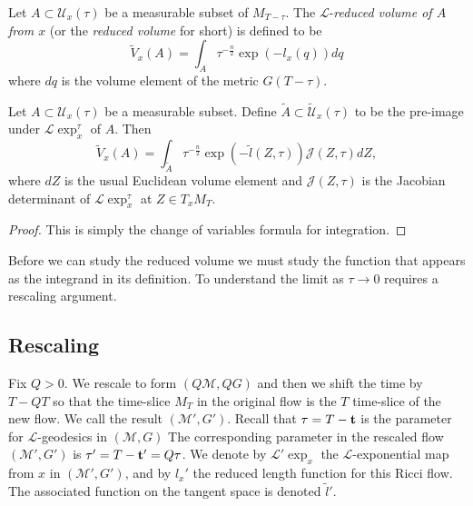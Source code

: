 \begin{definition}\label{def:reduced-volume}
\label{redvol}
Let $A\subset {\mathcal U}_x(\tau)$ be a  measurable subset of
$M_{T-\tau}$. The $\mathcal{L}$-{\em reduced volume of $A$ from $x$}
(or the {\em reduced volume} for short) is
defined to be
$$\widetilde V_x(A) = \int_{A} \tau^{-\frac{n}{2}}\exp(-l_x(q))dq$$ where $dq$ is the volume
element of the metric $G(T-\tau)$.
\end{definition}




\begin{lemma}\label{lem:reduced-volume-pullback}
\label{redvoltilde}
Let $A\subset {\mathcal U}_x(\tau)$ be a  measurable subset. Define
$\widetilde A\subset \widetilde{\mathcal U}_x(\tau)$ to be the
pre-image under ${\mathcal L}\exp_x^{\tau}$ of $A$. Then
$$\widetilde V_x(A)=\int_{\widetilde A}\tau^{-\frac{n}{2}}\exp(-\tilde l(Z, \tau)){\mathcal J}(Z,\tau)dZ,$$ where $dZ$ is the usual
Euclidean volume element and ${\mathcal J}(Z,\tau)$ is the Jacobian determinant
of ${\mathcal L}\exp_x^{\tau}$ at $Z\in T_xM_T$.
\end{lemma}

\begin{proof}
This is simply the change of variables formula for integration.
\end{proof}






Before we can study the reduced volume we must study the function
that appears as the integrand in its definition. To understand the
limit as $\tau\rightarrow 0$ requires a rescaling argument.


\subsection{Rescaling}


Fix $Q>0$. We rescale to form $(Q{\mathcal M},QG)$ and then we shift
the time by $T-QT$ so that the time-slice $M_T$ in the original flow
is the $T$ time-slice of the new flow. We call the result
$({\mathcal M}',G')$. Recall that $\tau=T-{\bf t}$ is the parameter
for ${\mathcal L}$-geodesics in $({\mathcal M},G)$ The corresponding
parameter in the rescaled flow $({\mathcal M}',G')$ is $\tau'=T-{\bf
t'}=Q\tau$. We denote by ${\mathcal L}'\exp_x$ the ${\mathcal
L}$-exponential map from $x$ in $({\mathcal M}',G')$, and by $l_x'$
the reduced length function for this Ricci flow. The associated
function on the tangent space is denoted $\tilde l'$.

